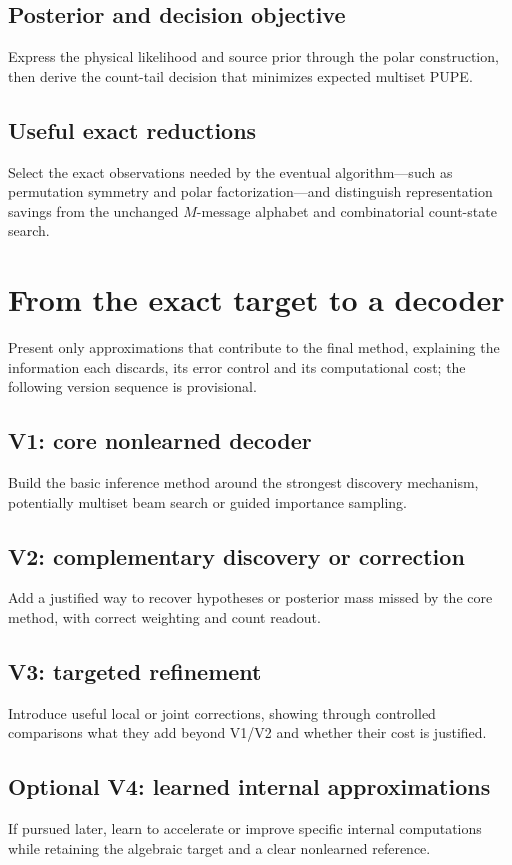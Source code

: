 \documentclass[10pt,a4paper]{article}
\begin{document}
\subsection{Posterior and decision objective}
Express the physical likelihood and source prior through the polar construction, then derive the count-tail decision that minimizes expected multiset PUPE.

\subsection{Useful exact reductions}
Select the exact observations needed by the eventual algorithm---such as permutation symmetry and polar factorization---and distinguish representation savings from the unchanged $M$-message alphabet and combinatorial count-state search.

\section{From the exact target to a decoder}
Present only approximations that contribute to the final method, explaining the information each discards, its error control and its computational cost; the following version sequence is provisional.

\subsection{V1: core nonlearned decoder}
Build the basic inference method around the strongest discovery mechanism, potentially multiset beam search or guided importance sampling.

\subsection{V2: complementary discovery or correction}
Add a justified way to recover hypotheses or posterior mass missed by the core method, with correct weighting and count readout.

\subsection{V3: targeted refinement}
Introduce useful local or joint corrections, showing through controlled comparisons what they add beyond V1/V2 and whether their cost is justified.

\subsection{Optional V4: learned internal approximations}
If pursued later, learn to accelerate or improve specific internal computations while retaining the algebraic target and a clear nonlearned reference.
\end{document}
